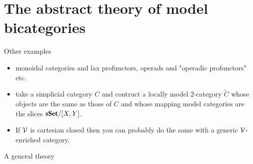 \documentclass[a4paper,12pt]{amsart}
\begin{document}
\section{The abstract theory of model bicategories}
Other examples
\begin{itemize}
\item monoidal categories and lax profunctors, operads and "operadic profunctors" etc.
\item take a simplicial category $C$ and contruct a locally model 2-category $\widetilde{C}$ whose objects are the same as those of $C$ and whose mapping model categories are the slices $\sSet/[X,Y]$. 
\item If $\mathcal{V}$ is cartesian closed then you can probably do the same with a generic $\mathcal{V}$-enriched category.
\end{itemize}
A general theory

{}

\hrulefill
\end{document}
